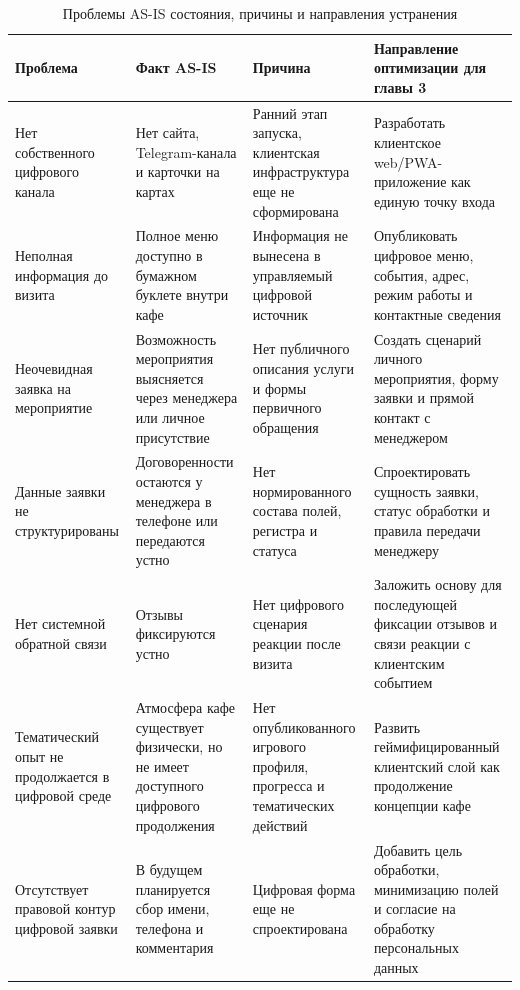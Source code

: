 \begin{table}[H]
\centering
\footnotesize
\caption{Проблемы AS-IS состояния, причины и направления устранения}
\label{tab:ch2_problems_causes}
\setlength{\tabcolsep}{3pt}
\begin{tabularx}{\textwidth}{|>{\raggedright\arraybackslash}p{}|>{\raggedright\arraybackslash}p{}|>{\raggedright\arraybackslash}p{}|>{\raggedright\arraybackslash}X|}
\hline
\textbf{Проблема} & \textbf{Факт AS-IS} & \textbf{Причина} & \textbf{Направление оптимизации для главы 3} \\ \hline
Нет собственного цифрового канала & Нет сайта, Telegram-канала и карточки на картах & Ранний этап запуска, клиентская инфраструктура еще не сформирована & Разработать клиентское web/PWA-приложение как единую точку входа \\ \hline
Неполная информация до визита & Полное меню доступно в бумажном буклете внутри кафе & Информация не вынесена в управляемый цифровой источник & Опубликовать цифровое меню, события, адрес, режим работы и контактные сведения \\ \hline
Неочевидная заявка на мероприятие & Возможность мероприятия выясняется через менеджера или личное присутствие & Нет публичного описания услуги и формы первичного обращения & Создать сценарий личного мероприятия, форму заявки и прямой контакт с менеджером \\ \hline
Данные заявки не структурированы & Договоренности остаются у менеджера в телефоне или передаются устно & Нет нормированного состава полей, регистра и статуса & Спроектировать сущность заявки, статус обработки и правила передачи менеджеру \\ \hline
Нет системной обратной связи & Отзывы фиксируются устно & Нет цифрового сценария реакции после визита & Заложить основу для последующей фиксации отзывов и связи реакции с клиентским событием \\ \hline
Тематический опыт не продолжается в цифровой среде & Атмосфера кафе существует физически, но не имеет доступного цифрового продолжения & Нет опубликованного игрового профиля, прогресса и тематических действий & Развить геймифицированный клиентский слой как продолжение концепции кафе \\ \hline
Отсутствует правовой контур цифровой заявки & В будущем планируется сбор имени, телефона и комментария & Цифровая форма еще не спроектирована & Добавить цель обработки, минимизацию полей и согласие на обработку персональных данных \\ \hline
\end{tabularx}
\normalsize
\end{table}

